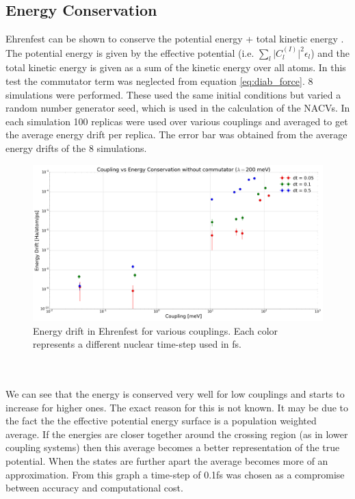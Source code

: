 \subsection{Energy Conservation}
Ehrenfest can be shown to conserve the potential energy + total kinetic energy \cite{john_c._tully_nonadiabatic_1998}. The potential energy is given by the effective potential (i.e. $\sum_{l} \vert C_{l}^{(I)} \vert^2 \epsilon_{l}$) and the total kinetic energy is given as a sum of the kinetic energy over all atoms. In this test the commutator term was neglected from equation \eqref{eq:diab_force}. 8 simulations were performed. These used the same initial conditions but varied a random number generator seed, which is used in the calculation of the NACVs. In each simulation 100 replicas were used over various couplings and averaged to get the average energy drift per replica. The error bar was obtained from the average energy drifts of the 8 simulations.
\begin{figure}
  \includegraphics[width=\textwidth]{./img/energy_conservation.png}
  \caption{\label{fig:Ehren_Ener_Cons}Energy drift in Ehrenfest for various couplings. Each color represents a different nuclear time-step used in fs.}
\end{figure}
\\\\
We can see that the energy is conserved very well for low couplings and starts to increase for higher ones. The exact reason for this is not known. It may be due to the fact the the effective potential energy surface is a population weighted average. If the energies are closer together around the crossing region (as in lower coupling systems) then this average becomes a better representation of the true potential. When the states are further apart the average becomes more of an approximation. From this graph a time-step of 0.1fs was chosen as a compromise between accuracy and computational cost.

